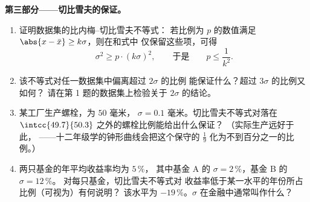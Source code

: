 \begin{problem}
\medskip
\noindent\textbf{第三部分——切比雪夫的保证。}
\begin{enumerate}[resume]
  \item 证明数据集的比内梅–切比雪夫不等式：
        若比例为 $p$ 的数值满足
        $\abs{x - \bar x} \geq k\sigma$，则在和式中
        仅保留这些项，可得
        \[
        \sigma^2 \geq p \cdot (k\sigma)^2,
        \qquad\text{于是}\qquad
        p \leq \frac{1}{k^2} .
        \]
  \item 该不等式对任一数据集中偏离超过 $2\sigma$ 的比例
        能保证什么？超过 $3\sigma$ 的比例又如何？
        请在第 1 题的数据集上检验关于
        $2\sigma$ 的结论。
  \item 某工厂生产螺栓，为 $50$ 毫米，
        $\sigma = 0.1$ 毫米。切比雪夫不等式对落在
        $\intcc{49.7}{50.3}$ 之外的螺栓比例能给出什么保证？
        （实际生产远好于此，
        ——十二年级学的钟形曲线会把这个保守的
        $\frac19$ 化为不到百分之一的比例。）
  \item 两只基金的年平均收益率均为 $5\,\%$，
        其中基金 A 的 $\sigma = 2\,\%$，基金 B 的 $\sigma = 12\,\%$。
        对每只基金，切比雪夫不等式对
        收益率低于某一水平的年份所占比例（可视为）有何说明？
        该水平为 $-19\,\%$。$\sigma$ 在金融中通常叫作什么？
\end{enumerate}


\end{problem}
